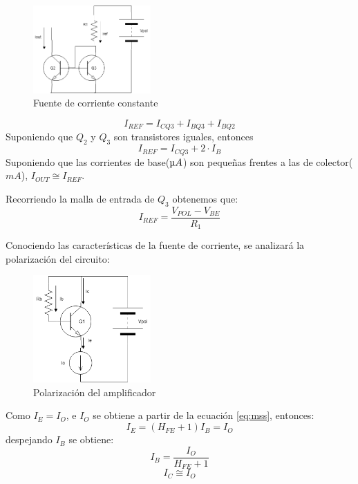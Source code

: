 \documentclass[../../main.tex]{subfiles}
\begin{document}
\begin{figure}[H]	
	\centering
	\includegraphics[width=0.4\textwidth]{imagenes/mirrorsource.png}
	\caption{Fuente de corriente constante}\label{fig:ms}
\end{figure}
\begin{equation}
I_{REF}=I_{CQ3}+I_{BQ3}+I_{BQ2}
\end{equation}
Suponiendo que $Q_2$ y $Q_3$ son transistores iguales, entonces
\begin{equation}
I_{REF}=I_{CQ3}+2\cdot I_{B}
\end{equation}
Suponiendo que las corrientes de base($\micro A$) son pequeñas frentes a las de colector($m A$),
$I_{OUT}\cong I_{REF}$.
\par Recorriendo la malla de entrada de $Q_3$ obtenemos que:
\begin{equation}
I_{REF}=\frac{V_{POL}-V_{BE}}{R_1}\label{eq:mss}
\end{equation}

Conociendo las características de la fuente de corriente, se analizar\'a la polarización del circuito:

\begin{figure}[H]	
	\centering
	\includegraphics[width=0.4\textwidth]{imagenes/pol.png}
	\caption{Polarizaci\'on del amplificador}
\end{figure}

Como $I_E=I_O $, e $ I_O $ se obtiene a partir de la ecuación \ref{eq:mss}, entonces:
\begin{equation}
I_E=\left( H_{FE} +1 \right)  I_B=I_O
\end{equation}
despejando $I_B$ se obtiene:
\begin{equation}
I_B=\frac{I_O}{H_{FE}+1}
\end{equation}
\begin{equation}
I_{C}\cong I_O
\end{equation}
\end{document}
